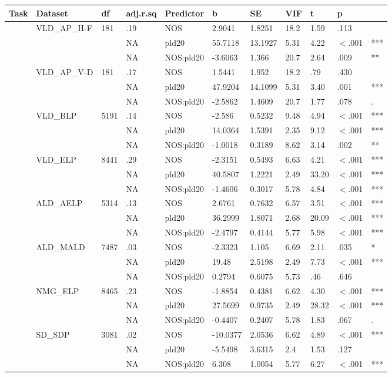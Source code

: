 \begin{table}[ht]
\centering
\begingroup\normalsize
\begin{tabular}{lllllllllll}
  \hline
Task & Dataset & df & adj.r.sq & Predictor & b & SE & VIF & t & p &  \\ 
  \hline
 & VLD\_AP\_H-F & 181 & .19 & NOS & 2.9041 & 1.8251 & 18.2 & 1.59 & .113 &   \\ 
   &  &  & NA & pld20 & 55.7118 & 13.1927 & 5.31 & 4.22 & $<$.001 & *** \\ 
   &  &  & NA & NOS:pld20 & -3.6063 & 1.366 & 20.7 & 2.64 & .009 & ** \\ 
   & VLD\_AP\_V-D & 181 & .17 & NOS & 1.5441 & 1.952 & 18.2 & .79 & .430 &   \\ 
   &  &  & NA & pld20 & 47.9204 & 14.1099 & 5.31 & 3.40 & .001 & *** \\ 
   &  &  & NA & NOS:pld20 & -2.5862 & 1.4609 & 20.7 & 1.77 & .078 & . \\ 
   & VLD\_BLP & 5191 & .14 & NOS & -2.586 & 0.5232 & 9.48 & 4.94 & $<$.001 & *** \\ 
   &  &  & NA & pld20 & 14.0364 & 1.5391 & 2.35 & 9.12 & $<$.001 & *** \\ 
   &  &  & NA & NOS:pld20 & -1.0018 & 0.3189 & 8.62 & 3.14 & .002 & ** \\ 
   & VLD\_ELP & 8441 & .29 & NOS & -2.3151 & 0.5493 & 6.63 & 4.21 & $<$.001 & *** \\ 
   &  &  & NA & pld20 & 40.5807 & 1.2221 & 2.49 & 33.20 & $<$.001 & *** \\ 
   &  &  & NA & NOS:pld20 & -1.4606 & 0.3017 & 5.78 & 4.84 & $<$.001 & *** \\ 
   & ALD\_AELP & 5314 & .13 & NOS & 2.6761 & 0.7632 & 6.57 & 3.51 & $<$.001 & *** \\ 
   &  &  & NA & pld20 & 36.2999 & 1.8071 & 2.68 & 20.09 & $<$.001 & *** \\ 
   &  &  & NA & NOS:pld20 & -2.4797 & 0.4144 & 5.77 & 5.98 & $<$.001 & *** \\ 
   & ALD\_MALD & 7487 & .03 & NOS & -2.3323 & 1.105 & 6.69 & 2.11 & .035 & * \\ 
   &  &  & NA & pld20 & 19.48 & 2.5198 & 2.49 & 7.73 & $<$.001 & *** \\ 
   &  &  & NA & NOS:pld20 & 0.2794 & 0.6075 & 5.73 & .46 & .646 &   \\ 
   & NMG\_ELP & 8465 & .23 & NOS & -1.8854 & 0.4381 & 6.62 & 4.30 & $<$.001 & *** \\ 
   &  &  & NA & pld20 & 27.5699 & 0.9735 & 2.49 & 28.32 & $<$.001 & *** \\ 
   &  &  & NA & NOS:pld20 & -0.4407 & 0.2407 & 5.78 & 1.83 & .067 & . \\ 
   & SD\_SDP & 3081 & .02 & NOS & -10.0377 & 2.0536 & 6.62 & 4.89 & $<$.001 & *** \\ 
   &  &  & NA & pld20 & -5.5498 & 3.6315 & 2.4 & 1.53 & .127 &   \\ 
   &  &  & NA & NOS:pld20 & 6.308 & 1.0054 & 5.77 & 6.27 & $<$.001 & *** \\ 
   \hline
\end{tabular}
\endgroup
\end{table}
